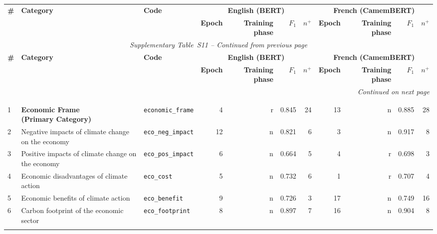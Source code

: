 \label{tab:training_hyperparameters}
\begin{longtable}{p{0.5cm}p{4.0cm}p{3.0cm}rrrrrrrr}
\toprule
\textbf{\#} & \textbf{Category} & \textbf{Code} & \multicolumn{4}{c}{\textbf{English (BERT)}} & \multicolumn{4}{c}{\textbf{French (CamemBERT)}} \\
\cmidrule(lr){4-7} \cmidrule(lr){8-11}
& & & \textbf{Epoch} & \textbf{Training phase} & \textbf{$F_1$} & \textbf{$n^{+}$} & \textbf{Epoch} & \textbf{Training phase} & \textbf{$F_1$} & \textbf{$n^{+}$} \\
\midrule
\endfirsthead
\multicolumn{11}{c}{\textit{Supplementary Table~S11 -- Continued from previous page}} \\
\toprule
\textbf{\#} & \textbf{Category} & \textbf{Code} & \multicolumn{4}{c}{\textbf{English (BERT)}} & \multicolumn{4}{c}{\textbf{French (CamemBERT)}} \\
\cmidrule(lr){4-7} \cmidrule(lr){8-11}
& & & \textbf{Epoch} & \textbf{Training phase} & \textbf{$F_1$} & \textbf{$n^{+}$} & \textbf{Epoch} & \textbf{Training phase} & \textbf{$F_1$} & \textbf{$n^{+}$} \\
\midrule
\endhead
\midrule
\multicolumn{11}{r}{\textit{Continued on next page}} \\
\endfoot
\bottomrule
\endlastfoot
\multicolumn{11}{l}{\cellcolor{gray!10}\textbf{MAIN FRAMES}} \\
\midrule
\rowcolor{gray!8}
\multicolumn{11}{l}{\textit{Economic Frame}} \\
\midrule
1 & \textbf{Economic Frame\newline (Primary Category)} & \texttt{economic\_frame} & 4 & r & 0.845 & 24 & 13 & n & 0.885 & 28 \\
\cmidrule(lr){1-11}
2 & Negative impacts of climate change on the economy & \texttt{eco\_neg\_impact} & 12 & n & 0.821 & 6 & 3 & n & 0.917 & 8 \\
3 & Positive impacts of climate change on the economy & \texttt{eco\_pos\_impact} & 6 & n & 0.664 & 5 & 4 & r & 0.698 & 3 \\
4 & Economic disadvantages of climate action & \texttt{eco\_cost} & 5 & n & 0.732 & 6 & 1 & r & 0.707 & 4 \\
5 & Economic benefits of climate action & \texttt{eco\_benefit} & 9 & n & 0.726 & 3 & 17 & n & 0.749 & 16 \\
6 & Carbon footprint of the economic sector & \texttt{eco\_footprint} & 8 & n & 0.897 & 7 & 16 & n & 0.904 & 8 \\
\midrule
\rowcolor{gray!8}

\end{longtable}
